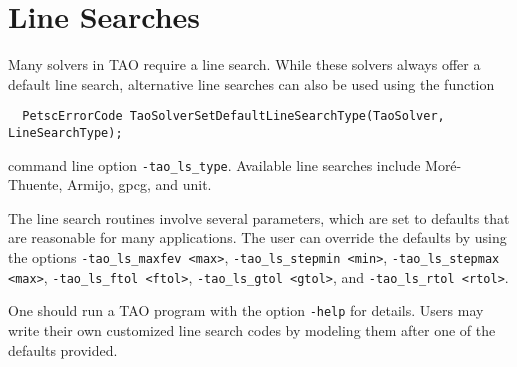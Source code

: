 \section{Line Searches} 
\label{sec:TaoLineSearch}

Many solvers in TAO require a line search.  While these solvers always
offer a default line search, alternative line searches can also be used
using the function
\begin{verbatim}
  PetscErrorCode TaoSolverSetDefaultLineSearchType(TaoSolver, LineSearchType);
\end{verbatim}
command line option  {\tt -tao\_ls\_type}.  Available line searches 
include Mor\'{e}-Thuente\cite{more:92}, Armijo, gpcg, and unit.

The line search routines involve several parameters, which are set
to defaults that are reasonable for many applications.  The user
can override the defaults by using the options
{\tt -tao\_ls\_maxfev <max>},
{\tt -tao\_ls\_stepmin <min>},
{\tt -tao\_ls\_stepmax <max>},
{\tt -tao\_ls\_ftol <ftol>},
{\tt -tao\_ls\_gtol <gtol>}, and
{\tt -tao\_ls\_rtol <rtol>}.

One should run a TAO program with the option 
{\tt -help}
for details.  Users may write their own customized line search codes
by modeling them after one of the defaults provided.

